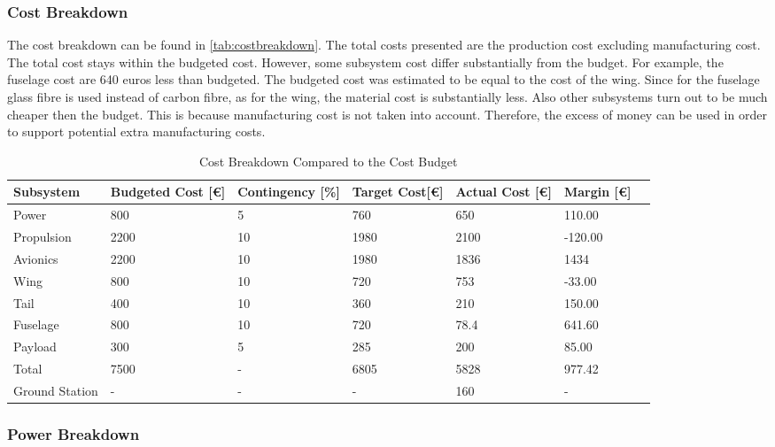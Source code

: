 \subsubsection{Cost Breakdown}
The cost breakdown can be found in \autoref{tab:costbreakdown}. The total costs presented are the production cost excluding manufacturing cost. The total cost stays within the budgeted cost. However, some subsystem cost differ substantially from the budget. For example, the fuselage cost are 640 euros less than budgeted. The budgeted cost was estimated to be equal to the cost of the wing. Since for the fuselage glass fibre is used instead of carbon fibre, as for the wing, the material cost is substantially less. Also other subsystems turn out to be much cheaper then the budget. This is because manufacturing cost is not taken into account. Therefore, the excess of money can be used in order to support potential extra manufacturing costs.

\begin{table}[H]
\centering
\caption{Cost Breakdown Compared to the Cost Budget}
\label{tab:costbreakdown}
\begin{tabular}{lp{2cm}lp{2cm}p{2cm}ll}
\toprule
\textbf{Subsystem} & \textbf{Budgeted Cost [\euro]} & \textbf{Contingency [\%]} & \textbf{Target Cost[\euro]} & \textbf{Actual Cost [\euro]} & \textbf{Margin [\euro]} \\ \midrule
Power & 800 & 5 & 760 & 650 & 110.00 \\ \hdashline
Propulsion & 2200 & 10 & 1980 & 2100 & -120.00 \\ \hdashline
Avionics & 2200 & 10 & 1980 & 1836 & 1434 \\ \hdashline
Wing & 800 & 10 & 720 & 753 & -33.00 \\ \hdashline
Tail & 400 & 10 & 360 & 210 & 150.00 \\ \hdashline
Fuselage & 800 & 10 & 720 & 78.4 & 641.60 \\ \hdashline
Payload & 300 & 5 & 285 & 200 & 85.00 \\ \hline \hline
Total & 7500 & - & 6805 & 5828 & 977.42 \\ \hline \hline
Ground Station & - & - & - & 160 & - \\ \bottomrule
\end{tabular}
\end{table}

\subsubsection{Power Breakdown}


